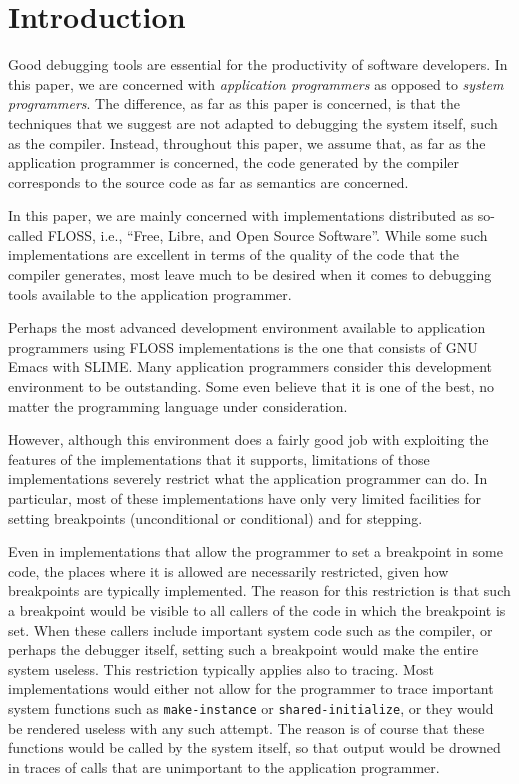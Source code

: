 \section{Introduction}
\label{sec-introduction}

Good debugging tools are essential for the productivity of software
developers.  In this paper, we are concerned with \emph{application
  programmers} as opposed to \emph{system programmers}.  The
difference, as far as this paper is concerned, is that the techniques
that we suggest are not adapted to debugging the system itself, such
as the compiler.  Instead, throughout this paper, we assume that, as
far as the application programmer is concerned, the code generated by
the compiler corresponds to the source code as far as semantics are
concerned.

In this paper, we are mainly concerned with \commonlisp{}
implementations distributed as so-called FLOSS, i.e., ``Free, Libre,
and Open Source Software''.  While some such implementations are
excellent in terms of the quality of the code that the compiler
generates, most leave much to be desired when it comes to debugging
tools available to the application programmer.

Perhaps the most advanced development environment available to
application programmers using FLOSS \commonlisp{} implementations is
the one that consists of GNU Emacs with SLIME.  Many application
programmers consider this development environment to be outstanding.
Some even believe that it is one of the best, no matter the
programming language under consideration.

However, although this environment does a fairly good job with
exploiting the features of the \commonlisp{} implementations that it
supports, limitations of those implementations severely restrict what
the application programmer can do.  In particular, most of these
implementations have only very limited facilities for setting
breakpoints (unconditional or conditional) and for stepping.

Even in implementations that allow the programmer to set a breakpoint
in some code, the places where it is allowed are necessarily
restricted, given how breakpoints are typically implemented.  The
reason for this restriction is that such a breakpoint would be visible
to all callers of the code in which the breakpoint is set.  When these
callers include important system code such as the compiler, or perhaps
the debugger itself, setting such a breakpoint would make the entire
system useless.  This restriction typically applies also to tracing.
Most \commonlisp{} implementations would either not allow for the
programmer to trace important system functions such as
\texttt{make-instance} or \texttt{shared-initialize}, or they would be
rendered useless with any such attempt.  The reason is of course that
these functions would be called by the system itself, so that output
would be drowned in traces of calls that are unimportant to the
application programmer.

